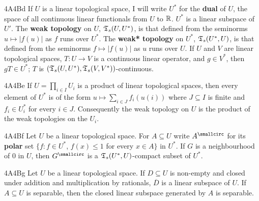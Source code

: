 \spheader 4A4Bd If $U$ is a linear topological space, I will write $U^*$
for the {\bf dual} of $U$, the space of all continuous linear
functionals from $U$ to
$\Bbb R$.   $U^*$ is a linear subspace of
$U'$.   The {\bf weak topology} on $U$,
$\frak T_s(U,U^*)$, is that defined from
the seminorms $u\mapsto|f(u)|$ as $f$ runs over
$U^*$. The {\bf weak* topology} on $U^*$, $\frak T_s(U^*,U)$, is
that defined from the seminorms
$f\mapsto|f(u)|$ as $u$ runs over $U$.
If $U$ and $V$ are linear topological spaces, $T:U\to V$ is a continuous
linear operator, and $g\in V^*$, then $gT\in U^*$;   $T$ is
$(\frak T_s(U,U^*),\frak T_s(V,V^*))$-continuous.

\spheader 4A4Be If $U=\prod_{i\in I}U_i$ is a product of linear
topological spaces, then every element of $U^*$ is of the form
$u\mapsto\sum_{i\in J}f_i(u(i))$ where $J\subseteq I$ is finite and
$f_i\in U_i^*$ for every $i\in J$.
Consequently the weak topology on $U$ is the
product of the weak topologies on the $U_i$.

\spheader 4A4Bf Let $U$ be a linear topological space.   For $A\subseteq U$
write $A^{\smallcirc}$ for its {\bf polar} set
$\{f:f\in U^*$, $f(x)\le 1$ for every $x\in A\}$ in $U^*$.
If $G$ is a neighbourhood of $0$ in $U$, then $G^{\smallcirc}$ is a
$\frak T_s(U^*,U)$-compact subset of $U^*$.

\spheader 4A4Bg Let $U$ be a linear topological
space.   If $D\subseteq U$ is non-empty and closed under addition and
multiplication by rationals, $\overline{D}$ is a linear subspace of $U$.
If $A\subseteq U$ is separable, then the closed linear subspace
generated by $A$ is separable.   

